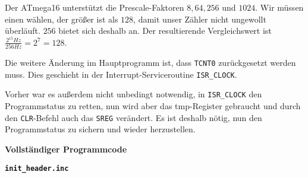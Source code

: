 \documentclass{CInf_practice}
\begin{document}
Der ATmega16 unterstützt die Prescale-Faktoren $8, 64, 256$ und $1024$. Wir 
müssen einen wählen, der größer ist als $128$, damit unser Zähler nicht 
ungewollt überläuft. $256$ bietet sich deshalb an. Der resultierende 
Vergleichswert ist $\frac{2^{15} Hz}{256 Hz} = 2^7 = 128$.

Die weitere Änderung im Hauptprogramm ist, dass \texttt{TCNT0} zurückgesetzt
werden muss. Dies geschieht in der Interrupt-Serviceroutine \texttt{ISR\_CLOCK}.

Vorher war es außerdem nicht unbedingt notwendig, in \texttt{ISR\_CLOCK} den 
Programmstatus zu retten, nun wird aber das tmp-Register gebraucht und durch
den \texttt{CLR}-Befehl auch das \texttt{SREG} verändert. Es ist deshalb nötig,
nun den Programmstatus zu sichern und wieder herzustellen.




\newpage
{\large\textbf{Vollständiger Programmcode}}


\bigskip

{\large\textbf{\texttt{init\_header.inc}}}

\end{document}
